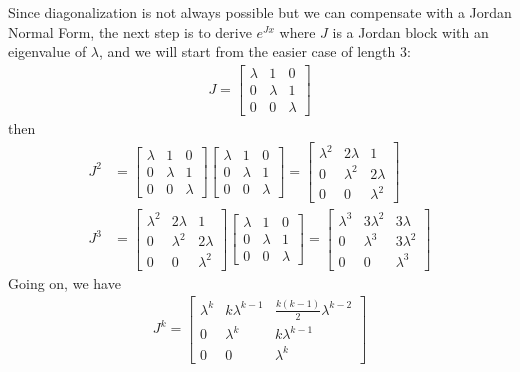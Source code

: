 Since diagonalization is not always possible but we can compensate with a Jordan Normal Form, the next step is to derive $e^{Jx}$ where $J$ is a Jordan block with an eigenvalue of $\lambda$, and we will start from the easier case of length $3$:
\begin{align*}
J = 
\begin{bmatrix}
\lambda & 1 & 0\\ 
0 & \lambda & 1 \\
0 & 0 & \lambda
\end{bmatrix}
\end{align*}
then
\begin{align*}
J^2 &= 
\begin{bmatrix}
\lambda & 1 & 0\\ 
0 & \lambda & 1 \\
0 & 0 & \lambda
\end{bmatrix}
\begin{bmatrix}
\lambda & 1 & 0\\ 
0 & \lambda & 1 \\
0 & 0 & \lambda
\end{bmatrix}
=
\begin{bmatrix}
\lambda^2 & 2\lambda & 1 \\ 
0 & \lambda^2 & 2\lambda \\
0 & 0 & \lambda^2
\end{bmatrix} \\
J^3 &=
\begin{bmatrix}
\lambda^2 & 2\lambda & 1 \\ 
0 & \lambda^2 & 2\lambda \\
0 & 0 & \lambda^2
\end{bmatrix}
\begin{bmatrix}
\lambda & 1 & 0\\ 
0 & \lambda & 1 \\
0 & 0 & \lambda
\end{bmatrix}
=
\begin{bmatrix}
\lambda^3 & 3\lambda^2 & 3\lambda \\
0 & \lambda^3 & 3\lambda^2 \\
0 & 0 & \lambda^3
\end{bmatrix}
\end{align*}
Going on, we have
\begin{align*}
J^k =
\begin{bmatrix}
\lambda^k & k\lambda^{k-1} & \frac{k(k-1)}{2}\lambda^{k-2}\\
0 & \lambda^k & k\lambda^{k-1} \\
0 & 0 & \lambda^k 
\end{bmatrix}
\end{align*}
